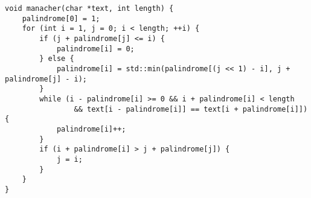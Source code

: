 \begin{lstlisting}
void manacher(char *text, int length) {
    palindrome[0] = 1;
    for (int i = 1, j = 0; i < length; ++i) {
        if (j + palindrome[j] <= i) {
            palindrome[i] = 0;
        } else {
            palindrome[i] = std::min(palindrome[(j << 1) - i], j + palindrome[j] - i);
        }
        while (i - palindrome[i] >= 0 && i + palindrome[i] < length 
                && text[i - palindrome[i]] == text[i + palindrome[i]]) {
            palindrome[i]++;
        }
        if (i + palindrome[i] > j + palindrome[j]) {
            j = i;
        }
    }
}
\end{lstlisting}
